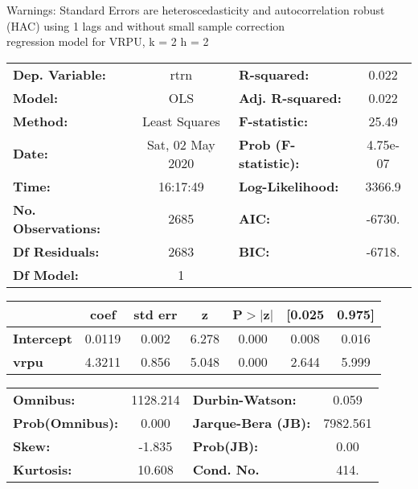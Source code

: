Warnings: \newline
 [1] Standard Errors are heteroscedasticity and autocorrelation robust (HAC) using 1 lags and without small sample correction\\ 

regression model for VRPU, k = 2 h = 2\begin{center}
\begin{tabular}{lclc}
\toprule
\textbf{Dep. Variable:}    &       rtrn       & \textbf{  R-squared:         } &     0.022   \\
\textbf{Model:}            &       OLS        & \textbf{  Adj. R-squared:    } &     0.022   \\
\textbf{Method:}           &  Least Squares   & \textbf{  F-statistic:       } &     25.49   \\
\textbf{Date:}             & Sat, 02 May 2020 & \textbf{  Prob (F-statistic):} &  4.75e-07   \\
\textbf{Time:}             &     16:17:49     & \textbf{  Log-Likelihood:    } &    3366.9   \\
\textbf{No. Observations:} &        2685      & \textbf{  AIC:               } &    -6730.   \\
\textbf{Df Residuals:}     &        2683      & \textbf{  BIC:               } &    -6718.   \\
\textbf{Df Model:}         &           1      & \textbf{                     } &             \\
\bottomrule
\end{tabular}
\begin{tabular}{lcccccc}
                   & \textbf{coef} & \textbf{std err} & \textbf{z} & \textbf{P$> |$z$|$} & \textbf{[0.025} & \textbf{0.975]}  \\
\midrule
\textbf{Intercept} &       0.0119  &        0.002     &     6.278  &         0.000        &        0.008    &        0.016     \\
\textbf{vrpu}      &       4.3211  &        0.856     &     5.048  &         0.000        &        2.644    &        5.999     \\
\bottomrule
\end{tabular}
\begin{tabular}{lclc}
\textbf{Omnibus:}       & 1128.214 & \textbf{  Durbin-Watson:     } &    0.059  \\
\textbf{Prob(Omnibus):} &   0.000  & \textbf{  Jarque-Bera (JB):  } & 7982.561  \\
\textbf{Skew:}          &  -1.835  & \textbf{  Prob(JB):          } &     0.00  \\
\textbf{Kurtosis:}      &  10.608  & \textbf{  Cond. No.          } &     414.  \\
\bottomrule
\end{tabular}
\end{center}

